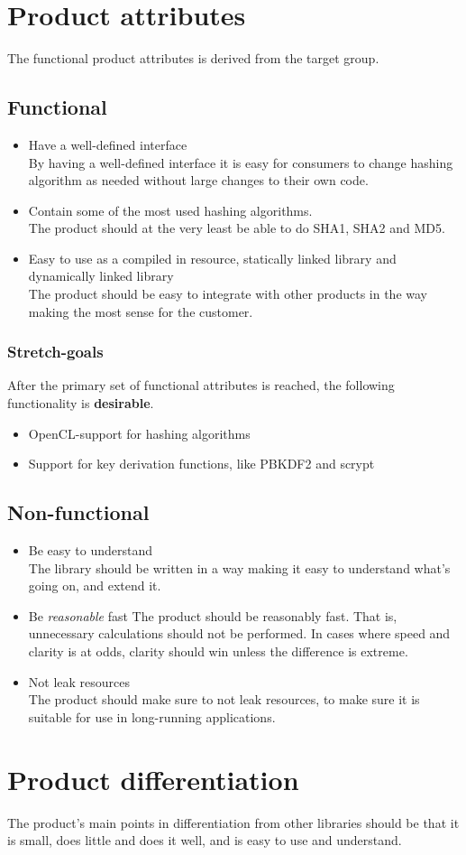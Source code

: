 \documentclass[12pt]{article}
\begin{document}
\section*{Product attributes}
The functional product attributes is derived from the target group.

\subsection*{Functional}
\begin{itemize}
\item Have a well-defined interface\\
By having a well-defined interface it is easy for consumers to change hashing algorithm as needed without large changes to their own code.
\item Contain some of the most used hashing algorithms.\\
The product should at the very least be able to do SHA1, SHA2 and MD5.
\item Easy to use as a compiled in resource, statically linked library and dynamically linked library\\
The product should be easy to integrate with other products in the way making the most sense for the customer.
\end{itemize}

\subsubsection*{Stretch-goals}
After the primary set of functional attributes is reached, the following functionality is \textbf{desirable}.
\begin{itemize}
\item OpenCL-support for hashing algorithms
\item Support for key derivation functions, like PBKDF2 and scrypt
\end{itemize}

\subsection*{Non-functional}
\begin{itemize}
\item Be easy to understand\\
The library should be written in a way making it easy to understand what's going on, and extend it.
\item Be \textit{reasonable} fast
The product should be reasonably fast. That is, unnecessary calculations should not be performed. In cases where speed and clarity is at odds, clarity should win unless the difference is extreme.
\item Not leak resources\\
The product should make sure to not leak resources, to make sure it is suitable for use in long-running applications.
\end{itemize}

\section*{Product differentiation}
The product's main points in differentiation from other libraries should be that it is small, does little and does it well, and is easy to use and understand.
\end{document}
